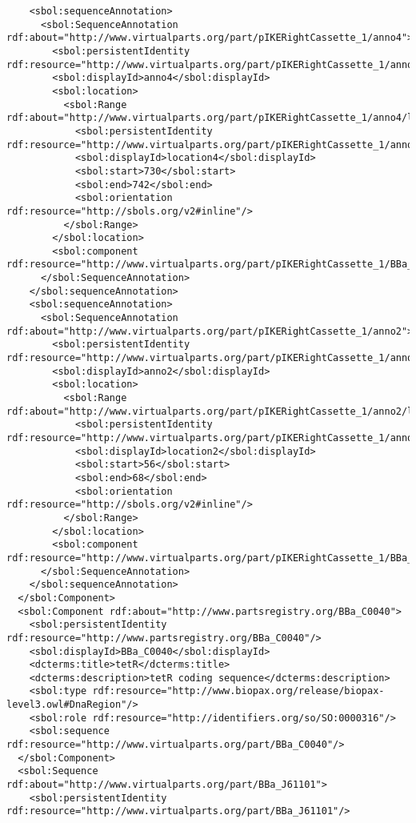 \begin{lstlisting}
    <sbol:sequenceAnnotation>
      <sbol:SequenceAnnotation rdf:about="http://www.virtualparts.org/part/pIKERightCassette_1/anno4">
        <sbol:persistentIdentity rdf:resource="http://www.virtualparts.org/part/pIKERightCassette_1/anno4"/>
        <sbol:displayId>anno4</sbol:displayId>
        <sbol:location>
          <sbol:Range rdf:about="http://www.virtualparts.org/part/pIKERightCassette_1/anno4/location4">
            <sbol:persistentIdentity rdf:resource="http://www.virtualparts.org/part/pIKERightCassette_1/anno4/location4"/>
            <sbol:displayId>location4</sbol:displayId>
            <sbol:start>730</sbol:start>
            <sbol:end>742</sbol:end>
            <sbol:orientation rdf:resource="http://sbols.org/v2#inline"/>
          </sbol:Range>
        </sbol:location>
        <sbol:component rdf:resource="http://www.virtualparts.org/part/pIKERightCassette_1/BBa_J61130"/>
      </sbol:SequenceAnnotation>
    </sbol:sequenceAnnotation>
    <sbol:sequenceAnnotation>
      <sbol:SequenceAnnotation rdf:about="http://www.virtualparts.org/part/pIKERightCassette_1/anno2">
        <sbol:persistentIdentity rdf:resource="http://www.virtualparts.org/part/pIKERightCassette_1/anno2"/>
        <sbol:displayId>anno2</sbol:displayId>
        <sbol:location>
          <sbol:Range rdf:about="http://www.virtualparts.org/part/pIKERightCassette_1/anno2/location2">
            <sbol:persistentIdentity rdf:resource="http://www.virtualparts.org/part/pIKERightCassette_1/anno2/location2"/>
            <sbol:displayId>location2</sbol:displayId>
            <sbol:start>56</sbol:start>
            <sbol:end>68</sbol:end>
            <sbol:orientation rdf:resource="http://sbols.org/v2#inline"/>
          </sbol:Range>
        </sbol:location>
        <sbol:component rdf:resource="http://www.virtualparts.org/part/pIKERightCassette_1/BBa_J61120"/>
      </sbol:SequenceAnnotation>
    </sbol:sequenceAnnotation>
  </sbol:Component>
  <sbol:Component rdf:about="http://www.partsregistry.org/BBa_C0040">
    <sbol:persistentIdentity rdf:resource="http://www.partsregistry.org/BBa_C0040"/>
    <sbol:displayId>BBa_C0040</sbol:displayId>
    <dcterms:title>tetR</dcterms:title>
    <dcterms:description>tetR coding sequence</dcterms:description>
    <sbol:type rdf:resource="http://www.biopax.org/release/biopax-level3.owl#DnaRegion"/>
    <sbol:role rdf:resource="http://identifiers.org/so/SO:0000316"/>
    <sbol:sequence rdf:resource="http://www.virtualparts.org/part/BBa_C0040"/>
  </sbol:Component>
  <sbol:Sequence rdf:about="http://www.virtualparts.org/part/BBa_J61101">
    <sbol:persistentIdentity rdf:resource="http://www.virtualparts.org/part/BBa_J61101"/>

\end{lstlisting}
